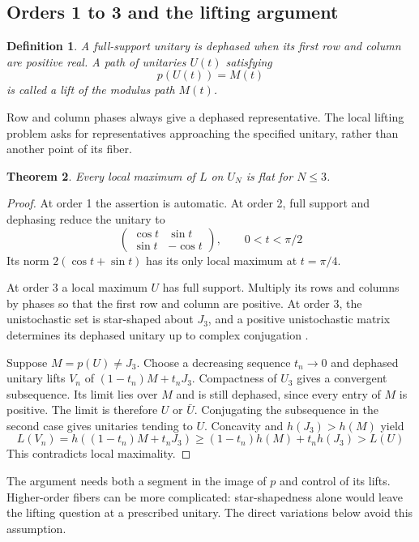 \documentclass[11pt,a4paper]{article}
\newtheorem{thm}{Theorem}[section]
\newtheorem{defn}[thm]{Definition}
\begin{document}
\subsection{Orders 1 to 3 and the lifting argument}\label{orderthree}
\begin{defn}
A full-support unitary is dephased when its first row and column are
positive real. A path of unitaries $U(t)$ satisfying
\[
 p(U(t))=M(t)
\]
is called a lift of the modulus path $M(t)$.
\end{defn}

Row and column phases always give a dephased representative. The local
lifting problem asks for representatives approaching the specified
unitary, rather than another point of its fiber.

\begin{thm}\label{threeflat}
Every local maximum of $L$ on $U_N$ is flat for $N\le3$.
\end{thm}
\begin{proof}
At order 1 the assertion is automatic. At order 2, full support
and dephasing reduce the unitary to
\[
 \begin{pmatrix}\cos t&\sin t\\\sin t&-\cos t\end{pmatrix},\qquad
 0<t<\pi/2
\]
Its norm $2(\cos t+\sin t)$ has its only local maximum at $t=\pi/4$.

At order 3 a local maximum $U$ has full support. Multiply its rows and columns by
phases so that the first row and column are positive. At order 3,
the unistochastic set is star-shaped about $J_3$, and a positive
unistochastic matrix determines its dephased unitary up to complex
conjugation \cite{BEKTZ,AMM}.

Suppose $M=p(U)\ne J_3$. Choose a decreasing sequence $t_n\to0$ and dephased unitary
lifts $V_n$ of $(1-t_n)M+t_nJ_3$. Compactness of $U_3$ gives a convergent
subsequence. Its limit lies over $M$ and is still dephased, since every
entry of $M$ is positive. The limit is therefore $U$ or $\bar U$.
Conjugating the subsequence in the second case gives unitaries tending
to $U$. Concavity and $h(J_3)>h(M)$ yield
\[
 L(V_n)=h((1-t_n)M+t_nJ_3)
 \ge (1-t_n)h(M)+t_n h(J_3)>L(U)
\]
This contradicts local maximality.
\end{proof}

The argument needs both a segment in the image of $p$ and control of
its lifts. Higher-order fibers can be more complicated: star-shapedness
alone would leave the lifting question at a prescribed unitary. The
direct variations below avoid this assumption.
\end{document}
